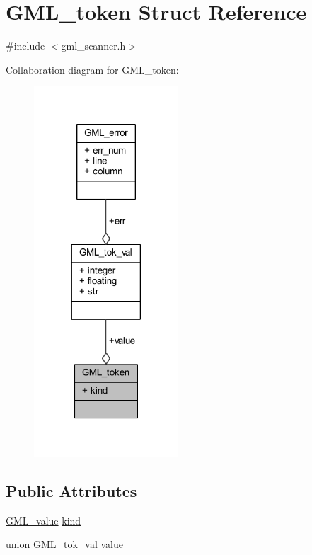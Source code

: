 \hypertarget{struct_g_m_l__token}{}\section{G\+M\+L\+\_\+token Struct Reference}
\label{struct_g_m_l__token}


{\ttfamily \#include $<$gml\+\_\+scanner.\+h$>$}



Collaboration diagram for G\+M\+L\+\_\+token\+:\nopagebreak
\begin{figure}[H]
\begin{center}
\leavevmode
\includegraphics[width=153pt]{struct_g_m_l__token__coll__graph}
\end{center}
\end{figure}
\subsection*{Public Attributes}
\begin{DoxyCompactItemize}
\item 
\mbox{\hyperlink{gml__scanner_8h_a2dc4839311e05f9a17adefcd0012b77f}{G\+M\+L\+\_\+value}} \mbox{\hyperlink{struct_g_m_l__token_a64e55496b543f370d8188b35095e0585}{kind}}
\item 
union \mbox{\hyperlink{union_g_m_l__tok__val}{G\+M\+L\+\_\+tok\+\_\+val}} \mbox{\hyperlink{struct_g_m_l__token_a50b20988e3fe419332313e8d9e02c775}{value}}
\end{DoxyCompactItemize}


